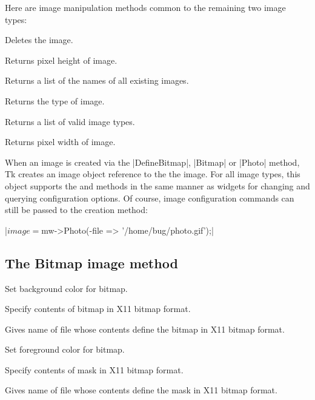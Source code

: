 Here are image manipulation methods common to the remaining two image types:

\begin{enum}{1cm}

Deletes the image.

Returns pixel height of image.

Returns a list of the names of all existing images.

Returns the type of image.

Returns a list of valid image types.

Returns pixel width of image.

\end{enum}

When an image is created via the |DefineBitmap|, |Bitmap| or |Photo| method, Tk
creates an image object reference to the the image. For all image
types, this object supports the  and 
methods in the same manner as widgets for changing and querying
configuration options.  Of course, image configuration commands can still
be passed to the creation method:

|$image = $mw->Photo(-file => '/home/bug/photo.gif');|

\subsection*{The Bitmap image method}
\vspace{-4pt}

\begin{enum}{1cm}

Set background color for bitmap.

Specify contents of bitmap in X11 bitmap format.

Gives name of file whose contents define the bitmap in X11 bitmap format.

Set foreground color for bitmap.

Specify contents of mask in X11 bitmap format.

Gives name of file whose contents define the mask in X11 bitmap format.

\end{enum}

